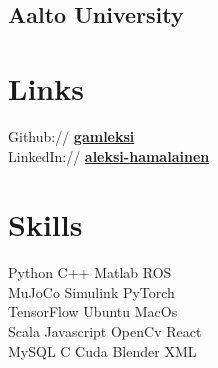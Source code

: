 \documentclass[]{deedy-resume}
\begin{document}
\begin{minipage}[t]{0.33\textwidth}
\subsection{Aalto University}
\sectionsep


\section{Links} 
Github:// \href{https://github.com/gamleksi}{\bf gamleksi} \\
LinkedIn://  \href{https://www.linkedin.com/in/aleksi-hamalainen}{\bf aleksi-hamalainen} \\
\sectionsep


\section{Skills}
Python \textbullet{} C++ \textbullet{} Matlab \textbullet{} ROS \\
MuJoCo \textbullet{} Simulink \textbullet{} PyTorch \\
TensorFlow \textbullet{}  Ubuntu \textbullet{} MacOs  \\
Scala \textbullet{} Javascript \textbullet{} OpenCv \textbullet{} React \\ 
MySQL \textbullet{} C \textbullet{} Cuda \textbullet{} Blender \textbullet{} XML \\    
\sectionsep



\end{minipage}
\end{document}
